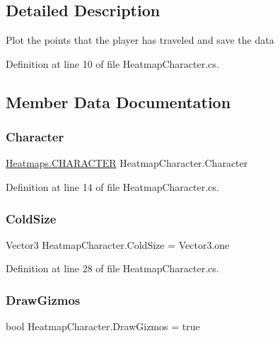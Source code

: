 \subsection{Detailed Description}
Plot the points that the player has traveled and save the data 



Definition at line 10 of file Heatmap\+Character.\+cs.



\subsection{Member Data Documentation}
\mbox{\label{class_heatmap_character_a169f22725aac4105f40b0621cd818de5}} 
\subsubsection{\texorpdfstring{Character}{Character}}
{\footnotesize\ttfamily \mbox{\hyperlink{class_heatmaps_a257e4582d0ae682783bce271d444d42b}{Heatmaps.\+C\+H\+A\+R\+A\+C\+T\+ER}} Heatmap\+Character.\+Character}



Definition at line 14 of file Heatmap\+Character.\+cs.

\mbox{\label{class_heatmap_character_a3d691639044d6a827f1ac99d8aae892d}} 
\subsubsection{\texorpdfstring{Cold\+Size}{ColdSize}}
{\footnotesize\ttfamily Vector3 Heatmap\+Character.\+Cold\+Size = Vector3.\+one}



Definition at line 28 of file Heatmap\+Character.\+cs.

\mbox{\label{class_heatmap_character_adf914a2914a6c25de3cac6244ac1365a}} 
\subsubsection{\texorpdfstring{Draw\+Gizmos}{DrawGizmos}}
{\footnotesize\ttfamily bool Heatmap\+Character.\+Draw\+Gizmos = true}



